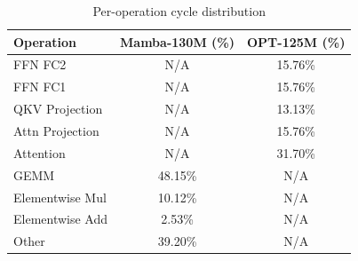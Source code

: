 \begin{table}[h]\centering
    \caption{Per-operation cycle distribution}
    \label{tab:layer_breakdown}
    \begin{tabular}{lcc}\hline
    Operation & Mamba-130M (\%) & OPT-125M (\%) \\\hline
        FFN FC2 & N/A & 15.76\% \\
    FFN FC1 & N/A & 15.76\% \\
    QKV Projection & N/A & 13.13\% \\
    Attn Projection & N/A & 15.76\% \\
    Attention & N/A & 31.70\% \\
    GEMM & 48.15\% & N/A \\
    Elementwise Mul & 10.12\% & N/A \\
    Elementwise Add & 2.53\% & N/A \\
    Other & 39.20\% & N/A \\
\hline\end{tabular}\end{table}
